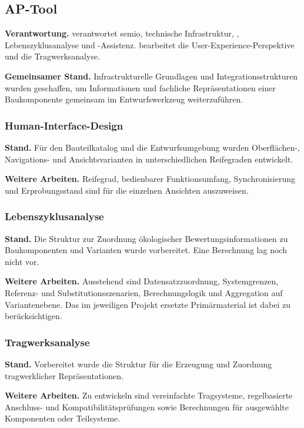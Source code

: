 \documentclass[type=zwischenbericht]{zukunftbau}
\begin{document}
\subsection{AP-Tool}

\textbf{Verantwortung.}  verantwortet semio, technische Infrastruktur, , Lebenszyklusanalyse und -Assistenz.  bearbeitet die User-Experience-Perspektive und die Tragwerksanalyse.

\textbf{Gemeinsamer Stand.} Infrastrukturelle Grundlagen und Integrationsstrukturen wurden geschaffen, um Informationen und fachliche Repräsentationen einer Baukomponente gemeinsam im Entwurfswerkzeug weiterzuführen.

\subsubsection{Human-Interface-Design}

\textbf{Stand.} Für den Bauteilkatalog und die Entwurfsumgebung wurden Oberflächen-, Navigations- und Ansichtsvarianten in unterschiedlichen Reifegraden entwickelt.

\textbf{Weitere Arbeiten.} Reifegrad, bedienbarer Funktionsumfang, Synchronisierung und Erprobungsstand sind für die einzelnen Ansichten auszuweisen.

\subsubsection{Lebenszyklusanalyse}

\textbf{Stand.} Die Struktur zur Zuordnung ökologischer Bewertungsinformationen zu Baukomponenten und Varianten wurde vorbereitet. Eine Berechnung lag noch nicht vor.

\textbf{Weitere Arbeiten.} Ausstehend sind Datensatzzuordnung, Systemgrenzen, Referenz- und Substitutionsszenarien, Berechnungslogik und Aggregation auf Variantenebene. Das im jeweiligen Projekt ersetzte Primärmaterial ist dabei zu berücksichtigen.

\subsubsection{Tragwerksanalyse}

\textbf{Stand.} Vorbereitet wurde die Struktur für die Erzeugung und Zuordnung tragwerklicher Repräsentationen.

\textbf{Weitere Arbeiten.} Zu entwickeln sind vereinfachte Tragsysteme, regelbasierte Anschluss- und Kompatibilitätsprüfungen sowie Berechnungen für ausgewählte Komponenten oder Teilsysteme.
\end{document}
